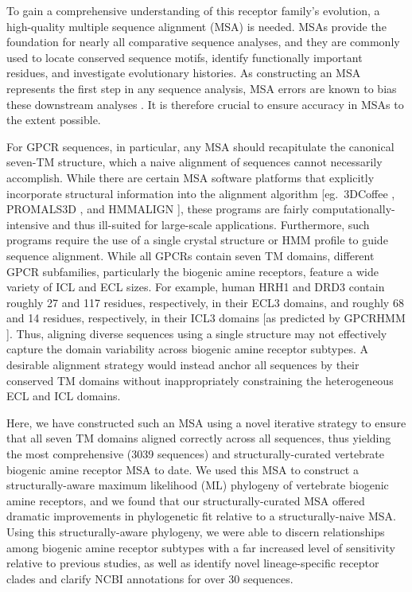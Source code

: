 \documentclass[fleqn,10pt]{wlpeerj}
\begin{document}
To gain a comprehensive understanding of this receptor family's evolution, a high-quality multiple sequence alignment (MSA) is needed. MSAs provide the foundation for nearly all comparative sequence analyses, and they are commonly used to locate conserved sequence motifs, identify functionally important residues, and investigate evolutionary histories. As constructing an MSA represents the first step in any sequence analysis, MSA errors are known to bias these downstream analyses \citep{Ogden2006, Wong2008, Jordan2012}. It is therefore crucial to ensure accuracy in MSAs to the extent possible. 

For GPCR sequences, in particular, any MSA should recapitulate the canonical seven-TM structure, which a naive alignment of sequences cannot necessarily accomplish. While there are certain MSA software platforms that explicitly incorporate structural information into the alignment algorithm [eg.\ 3DCoffee \citep{3dcoffee}, PROMALS3D \citep{promals3d}, and HMMALIGN \citep{hmmer}], these programs are fairly computationally-intensive and thus ill-suited for large-scale applications. Furthermore, such programs require the use of a single crystal structure or HMM profile to guide sequence alignment. While all GPCRs contain seven TM domains, different GPCR subfamilies, particularly the biogenic amine receptors, feature a wide variety of ICL and ECL sizes. For example, human HRH1 and DRD3 contain roughly 27 and 117 residues, respectively, in their ECL3 domains, and roughly 68 and 14 residues, respectively, in their ICL3 domains [as predicted by GPCRHMM \citep{Wistrand2006}]. Thus, aligning diverse sequences using a single structure may not effectively capture the domain variability across biogenic amine receptor subtypes. A desirable alignment strategy would instead anchor all sequences by their conserved TM domains without inappropriately constraining the heterogeneous ECL and ICL domains.

Here, we have constructed such an MSA using a novel iterative strategy to ensure that all seven TM domains aligned correctly across all sequences, thus yielding the most comprehensive (3039 sequences) and structurally-curated vertebrate biogenic amine receptor MSA to date. We used this MSA to construct a structurally-aware maximum likelihood (ML) phylogeny of vertebrate biogenic amine receptors, and we found that our structurally-curated MSA offered dramatic improvements in phylogenetic fit relative to a structurally-naive MSA. Using this structurally-aware phylogeny, we were able to discern relationships among biogenic amine receptor subtypes with a far increased level of sensitivity relative to previous studies, as well as identify novel lineage-specific receptor clades and clarify NCBI annotations for over 30 sequences. 
\end{document}
